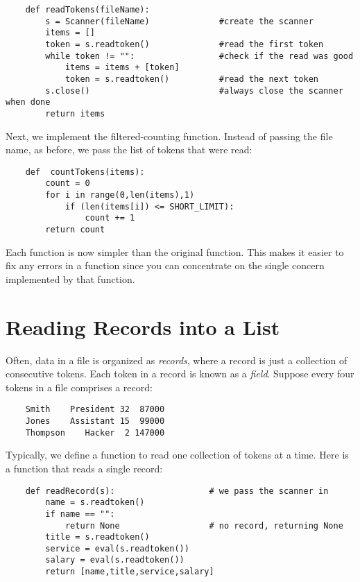 \begin{verbatim}
    def readTokens(fileName):
        s = Scanner(fileName)              #create the scanner
        items = []
        token = s.readtoken()              #read the first token
        while token != "":                 #check if the read was good
            items = items + [token]
            token = s.readtoken()          #read the next token
        s.close()                          #always close the scanner when done
        return items
\end{verbatim}

Next, we implement the filtered-counting function. Instead of passing
the file name, as before, we pass the list of tokens that
were read:

\begin{verbatim}
    def  countTokens(items):
        count = 0
        for i in range(0,len(items),1)
            if (len(items[i]) <= SHORT_LIMIT):
                count += 1
        return count
\end{verbatim}

Each function is now simpler than the original function. This makes
it easier to fix any errors in a function since you can concentrate
on the single concern implemented by that function.

\section{Reading Records into a List}

Often, data in a file is organized as {\it records}, where
a record is just a collection of consecutive tokens.
Each token in a record is known as a {\it field}.
Suppose every four tokens in a file comprises a record:

\begin{verbatim}
    Smith    President 32  87000
    Jones    Assistant 15  99000
    Thompson    Hacker  2 147000
\end{verbatim}

Typically, we define a function to read one collection of tokens
at a time.
Here is a function that reads a single record:

\begin{verbatim}
    def readRecord(s):                   # we pass the scanner in
        name = s.readtoken()
        if name == "":
            return None                  # no record, returning None
        title = s.readtoken()
        service = eval(s.readtoken())
        salary = eval(s.readtoken())
        return [name,title,service,salary]
\end{verbatim}

